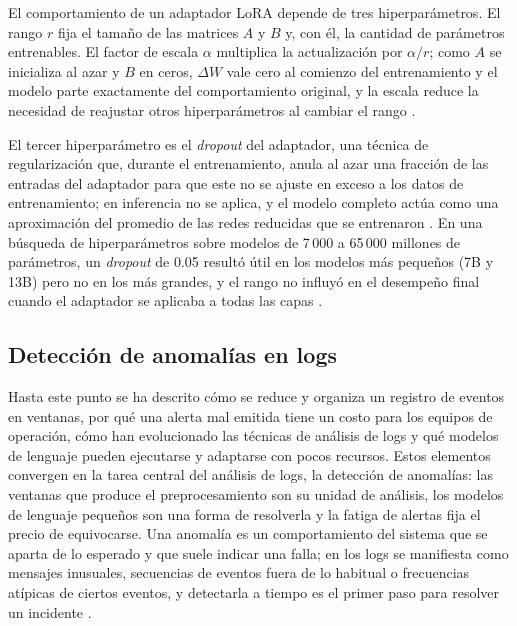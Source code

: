 
El comportamiento de un adaptador LoRA depende de tres hiperparámetros. El rango $r$ fija el tamaño de las matrices $A$ y $B$ y, con él, la cantidad de parámetros entrenables. El factor de escala $\alpha$ multiplica la actualización por $\alpha / r$; como $A$ se inicializa al azar y $B$ en ceros, $\Delta W$ vale cero al comienzo del entrenamiento y el modelo parte exactamente del comportamiento original, y la escala reduce la necesidad de reajustar otros hiperparámetros al cambiar el rango \cite{hu2022_lora}.

El tercer hiperparámetro es el \textit{dropout} del adaptador, una técnica de regularización que, durante el entrenamiento, anula al azar una fracción de las entradas del adaptador para que este no se ajuste en exceso a los datos de entrenamiento; en inferencia no se aplica, y el modelo completo actúa como una aproximación del promedio de las redes reducidas que se entrenaron \cite{srivastava2014_dropout}. En una búsqueda de hiperparámetros sobre modelos de 7\,000 a 65\,000 millones de parámetros, un \textit{dropout} de 0.05 resultó útil en los modelos más pequeños (7B y 13B) pero no en los más grandes, y el rango no influyó en el desempeño final cuando el adaptador se aplicaba a todas las capas \cite{dettmers2023_qlora}.

\subsection{Detección de anomalías en logs}\label{sec:mt_anomalias}

Hasta este punto se ha descrito cómo se reduce y organiza un registro de eventos en ventanas, por qué una alerta mal emitida tiene un costo para los equipos de operación, cómo han evolucionado las técnicas de análisis de logs y qué modelos de lenguaje pueden ejecutarse y adaptarse con pocos recursos. Estos elementos convergen en la tarea central del análisis de logs, la detección de anomalías: las ventanas que produce el preprocesamiento son su unidad de análisis, los modelos de lenguaje pequeños son una forma de resolverla y la fatiga de alertas fija el precio de equivocarse. Una anomalía es un comportamiento del sistema que se aparta de lo esperado y que suele indicar una falla; en los logs se manifiesta como mensajes inusuales, secuencias de eventos fuera de lo habitual o frecuencias atípicas de ciertos eventos, y detectarla a tiempo es el primer paso para resolver un incidente \cite{he2021_survey}.

